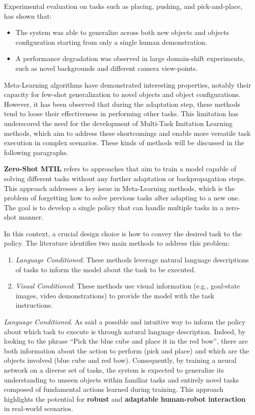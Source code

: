 
\newline Experimental evaluation on tasks such as placing, pushing, and pick-and-place, has shown that: \begin{itemize}
    \item The system was able to generalize across both new objects and objects configuration starting from only a single human demonstration.
    \item A performance degradation was observed in large domain-shift experiments, such as novel backgrounds and different camera view-points.
\end{itemize}


Meta-Learning algorithms have demonstrated interesting properties, notably their capacity for few-shot generalization to novel objects and object configurations. However, it has been observed that during the adaptation step, these methods tend to loose their effectiveness in performing other tasks. This limitation has underscored the need for the development of Multi-Task Imitation Learning methods, which aim to address these shortcomings and enable more versatile task execution in complex scenarios. These kinds of methods will be discussed in the following paragraphs.

\textbf{Zero-Shot MTIL} refers to approaches that aim to train a model capable of solving different tasks without any further adaptation or backpropagation steps. This approach addresses a key issue in Meta-Learning methods, which is the problem of forgetting how to solve previous tasks after adapting to a new one. The goal is to develop a single policy that can handle multiple tasks in a zero-shot manner.

In this context, a crucial design choice is how to convey the desired task to the policy. The literature identifies two main methods to address this problem:

\begin{enumerate}
    \item \textit{Language Conditioned}: These methods leverage natural language descriptions of tasks to inform the model about the task to be executed.
    \item \textit{Visual Conditioned}: These methods use visual information (e.g., goal-state images, video demonstrations) to provide the model with the task instructions.
\end{enumerate}

\textit{Language Conditioned}. As said a possible and intuitive way to inform the policy about which task to execute is through natural language description. Indeed, by looking to the phrase ``Pick the blue cube and place it in the red bow'', there are both information about the action to perform (pick and place) and which are the objects involved (blue cube and red bow). Consequently, by training a neural network on a diverse set of tasks, the system is expected to generalize its understanding to unseen objects within familiar tasks and entirely novel tasks composed of fundamental actions learned during training. This approach highlights the potential for \textbf{robust} and \textbf{adaptable} \textbf{human-robot interaction} in real-world scenarios.

